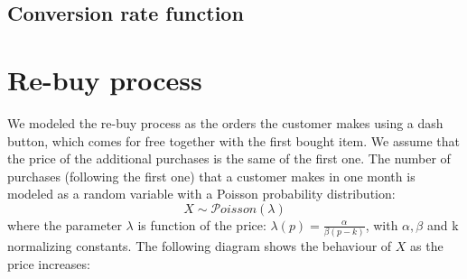 \documentclass[12pt,a4paper]{report}
\begin{document}
			\subsection{Conversion rate function}

		\section{Re-buy process}
We modeled the re-buy process as the orders the customer makes using a dash button, which comes for free together with the first bought item. We assume that the price of the additional purchases is the same of the first one.
The number of purchases (following the first one) that a customer makes in one month is modeled as a random variable with a Poisson probability distribution:
\[X \sim  \mathcal{P}oisson   (\lambda) \]
where the parameter $\lambda$ is function of the price: $\lambda(p) = \frac{\alpha}{\beta(p-k)}$, with $\alpha, \beta$ and k normalizing constants. The following diagram shows the behaviour of $X$ as the price increases:
\end{document}
